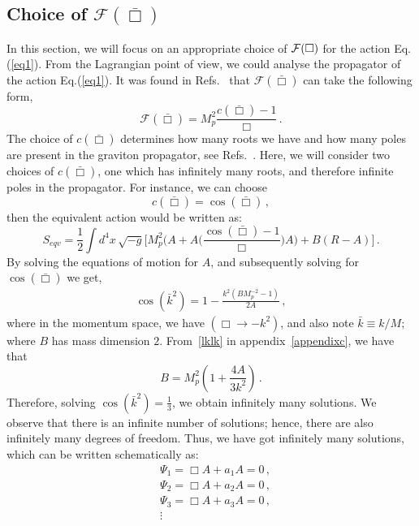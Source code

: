 \documentclass[a4paper,12pt]{article}
\newcommand{\bbox}{\bar{\Box}}
\newcommand{\be}{\begin{equation}}
\newcommand{\ee}{\end{equation}}
\newcommand{\+}{^{\dagger}}
\newcommand{\kb}{\bar{k}}
\newcommand{\2}{\frac{1}{2}}
\newcommand{\3}{\frac{1}{3}}
\newcommand{\4}{\frac{1}{4}}
\newcommand{\6}{\frac{1}{6}}
\newcommand{\8}{\frac{1}{8}}
\begin{document}

\subsection{Choice of $\mathcal{F}(\bbox)$}
\label{mimi}


In this section, we will focus on an appropriate choice of ${\cal F}(\Box)$ for the action Eq.(\ref{eq1}). From the Lagrangian point of view, we could analyse the propagator of the action Eq.(\ref{eq1}). It was found in Refs.~\cite{Biswas:2005qr,Biswas:2011ar} that $\mathcal{F}(\bbox)$ can take the following form,
%
\begin{equation}\label{generalfbox}
\mathcal{F}(\bbox)=M^{2}_{p}\frac{c(\bbox)-1}{\Box}\,.
\end{equation}
%
The  choice of $c(\bbox)$ determines how many roots we have and how many poles are present in the graviton propagator, see Refs.~\cite{Biswas:2005qr,Biswas:2011ar,Biswas:2013kla}. Here, we will consider two choices of $c(\bbox)$, one which has infinitely many roots, and therefore infinite poles in the propagator. 
 For instance, we can choose 
\begin{equation}
c(\bbox)=\cos(\bbox)\,,
\end{equation}
then the equivalent action would be written as: 
\begin{equation}\label{badaction}
S_{eqv}=\frac{1}{2}\int d^{4} x \, \sqrt{-g}\bigg[M^{2}_{p}\bigg(A+A\big(\frac{\cos(\bbox)-1}{\Box}\big)A\bigg
)+B(R-A)\bigg]\,.
\end{equation}
By solving the equations of motion for $A$, and subsequently solving for $\cos(\bbox)$
we get,
\begin{eqnarray}
\cos(\bar{k}^{2})=1-\frac{k^{2}(BM^{-2}_{p}-1)}{2A}\,,
\end{eqnarray}
where in the momentum space, we have $(\Box\rightarrow -k^2)$, and also
 note $\bar{k}\equiv k/M$; where
$B$ has mass dimension $2$. From~\eqref{lklk} in appendix~\ref{appendixc}, we have that
\be
B=M^{2}_{p}\left(1+\frac{4A}{3k^{2}}\right) \,.
\ee
Therefore, solving $\cos (\kb^2)=\frac{1}{3}$, we obtain infinitely many solutions. We observe that there is an infinite number of solutions; hence, there are also infinitely many degrees of freedom. Thus, we have got infinitely many solutions, which can be written schematically as:\  
\begin{align}\label{qwqw}
&\Psi_{1}=\Box A+a_1 A=0\,,\nonumber\\
&\Psi_{2}=\Box A+a_2 A=0\,,\nonumber\\
&\Psi_{3}=\Box A +a_{3}A=0\,,\nonumber\\
&\vdots
\end{align}
\end{document}
